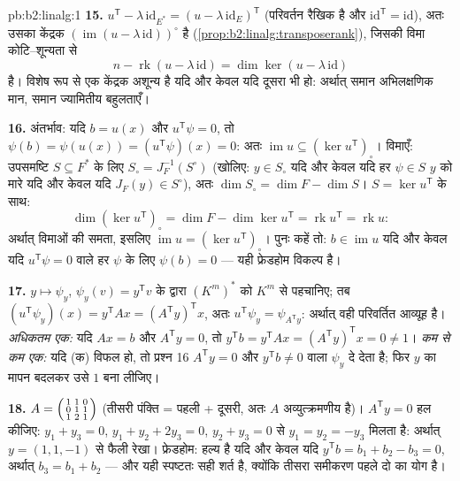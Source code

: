 \begin{solution}{pb:b2:linalg:1}
\textbf{15.} $u^{\mathsf T} - \lambda\,\mathrm{id}_{E^*} = (u -
\lambda\,\mathrm{id}_E)^{\mathsf T}$ (परिवर्तन रैखिक है और $\mathrm{id}^{\mathsf T} = \mathrm{id}$), अतः उसका केंद्रक
$(\operatorname{im}(u - \lambda\,\mathrm{id}))^\circ$
है (\cref{prop:b2:linalg:transposerank}), जिसकी विमा कोटि--शून्यता से
\[
n - \operatorname{rk}(u - \lambda\,\mathrm{id})
= \dim\ker(u - \lambda\,\mathrm{id})
\]
है। विशेष रूप से एक केंद्रक अशून्य है यदि और केवल यदि दूसरा भी हो:
अर्थात् समान अभिलक्षणिक मान, समान ज्यामितीय बहुलताएँ।

\textbf{16.} अंतर्भाव: यदि $b = u(x)$ और $u^{\mathsf T}\psi =
0$, तो $\psi(b) = \psi(u(x)) = (u^{\mathsf T}\psi)(x) = 0$: अतः $\operatorname{im} u \subseteq (\ker u^{\mathsf T})_\circ$। विमाएँ:
उपसमष्टि $S \subseteq F^*$ के लिए $S_\circ =
J_F^{-1}(S^\circ)$ (खोलिए: $y \in S_\circ$ यदि और केवल यदि हर $\psi \in
S$ $y$ को मारे
यदि और केवल यदि $J_F(y) \in S^\circ$), अतः $\dim S_\circ = \dim
F - \dim S$। $S = \ker u^{\mathsf T}$ के साथ:
\[
\dim(\ker u^{\mathsf T})_\circ
= \dim F - \dim\ker u^{\mathsf T}
= \operatorname{rk} u^{\mathsf T} = \operatorname{rk} u :
\]
अर्थात् विमाओं की समता, इसलिए $\operatorname{im} u = (\ker
u^{\mathsf T})_\circ$। पुनः कहें तो: $b \in \operatorname{im} u$ यदि और केवल यदि
$u^{\mathsf T}\psi = 0$ वाले हर $\psi$ के लिए $\psi(b) = 0$ --- यही फ्रेडहोम विकल्प है।

\textbf{17.} $y \mapsto \psi_y$, $\psi_y(v) = y^{\mathsf T}v$ के द्वारा $(K^m)^*$ को $K^m$ से पहचानिए; तब $(u^{\mathsf T}\psi_y)(x) =
y^{\mathsf T}Ax = (A^{\mathsf T}y)^{\mathsf T}x$, अतः
$u^{\mathsf
T}\psi_y = \psi_{A^{\mathsf T}y}$: अर्थात्  वही परिवर्तित आव्यूह है। \emph{अधिकतम एक:} यदि
$Ax = b$ और $A^{\mathsf T}y = 0$, तो $y^{\mathsf T}b = y^{\mathsf T}Ax =
(A^{\mathsf T}y)^{\mathsf T}x = 0 \neq 1$। \emph{कम से कम एक:} यदि (क) विफल हो, तो प्रश्न 16
$A^{\mathsf T}y
= 0$ और $y^{\mathsf T}b \neq 0$ वाला $\psi_y$ दे देता है; फिर $y$ का मापन बदलकर उसे $1$ बना
लीजिए।

\textbf{18.} $A = \begin{psmallmatrix} 1 & 1 & 0\\ 0 & 1 & 1\\
1 & 2 & 1\end{psmallmatrix}$ (तीसरी पंक्ति = पहली + दूसरी, अतः $A$ अव्युत्क्रमणीय
है)। $A^{\mathsf T}y = 0$ हल कीजिए: $y_1 + y_3 = 0$, $y_1
+ y_2 + 2y_3 = 0$, $y_2 + y_3 = 0$ से $y_1 = y_2 = -y_3$ मिलता है: अर्थात् $y = (1, 1, -1)$ से फैली
रेखा। फ्रेडहोम: हल्य है यदि और केवल यदि $y^{\mathsf T}b = b_1 + b_2 - b_3 = 0$, अर्थात् $b_3 = b_1 + b_2$ --- और यही
स्पष्टतः सही शर्त है, क्योंकि तीसरा समीकरण पहले दो का योग है।


\end{solution}
